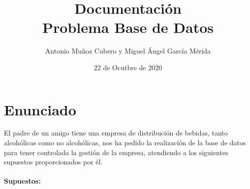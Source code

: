 \documentclass{article}
\title{Documentación \\\large \textbf{Problema Base de Datos}}
\author{Antonio Muñoz Cubero y Miguel Ángel García Mérida}
\date{22 de Ocutbre de 2020}
\begin{document}
  \maketitle
  \newpage
    \section{Enunciado}
    El padre de un amigo tiene una empresa de distribución de bebidas, tanto alcohólicas como no alcohólicas, nos ha pedido la realización de la base de datos para tener controlada la gestión de la empresa, 
    atendiendo a los siguientes supuestos proporcionados por él.
    \\
    \\
    \textbf{Supuestos:}
    \\
      \begin{enumerate}
        

\end{enumerate}
\end{document}
